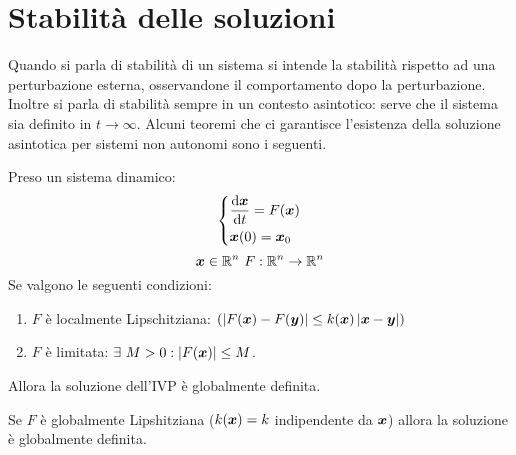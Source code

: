 \section{Stabilità delle soluzioni}%
\label{sub:Stabilità delle soluzioni}
Quando si parla di stabilità di un sistema si intende la stabilità rispetto ad una perturbazione esterna, osservandone il comportamento dopo la perturbazione.\\
Inoltre si parla di stabilità sempre in un contesto asintotico: serve che il sistema sia definito in $t\to \infty$. Alcuni teoremi che ci garantisce l'esistenza della soluzione asintotica per sistemi non autonomi sono i seguenti.
\begin{thm}
    Preso un sistema dinamico:
    \[\begin{dcases}
        \frac{\text{d} \boldsymbol{x}}{\text{d} t} = F(\boldsymbol{x}) \\
	\boldsymbol{x} (0)=\boldsymbol{x}_0
    \end{dcases}\] 
    \[
	\boldsymbol{x}\in \mathbb{R}^n \ F: \mathbb{R}^n \to \mathbb{R}^n  
    \] 
    Se valgono le seguenti condizioni:
    \begin{enumerate}
        \item $F$ è localmente Lipschitziana: $(\left|F(\boldsymbol{x})- F(\boldsymbol{y})\right|\le k(\boldsymbol{x})\left|\boldsymbol{x}-\boldsymbol{y}\right|)$
	\item $F$ è limitata: $\exists \ M >0 : \left|F(\boldsymbol{x})\right|\le M$.
    \end{enumerate}
    Allora la soluzione dell'IVP è globalmente definita.
\end{thm}
\noindent
\begin{thm}
    Se $F$ è globalmente Lipshitziana ($k(\boldsymbol{x})=k$ indipendente da $\boldsymbol{x}$) allora la soluzione è globalmente definita.
\end{thm}
\noindent
